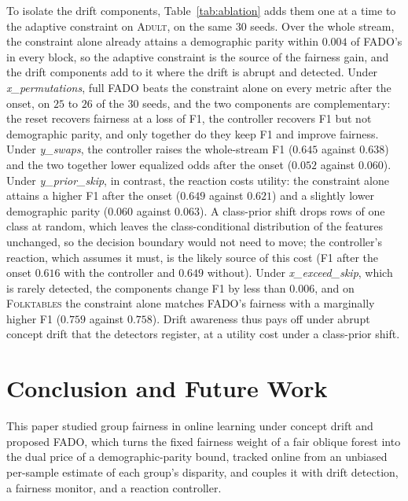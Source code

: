 \documentclass[conference]{IEEEtran}
\newcommand{\fado}{\textsc{FADO}}
\newcommand{\adult}{\textsc{Adult}}
\newcommand{\folk}{\textsc{Folktables}}
\newcommand{\rev}[1]{{\color{blue}#1}}
\renewcommand{\rev}[1]{#1}
\begin{document}
\rev{To isolate the drift components, Table~\ref{tab:ablation} adds them one at a time to the adaptive constraint on \adult{}, on the same $30$ seeds. Over the
whole stream, the constraint alone already attains a demographic parity within $0.004$ of \fado{}'s in every block, so the adaptive constraint is the source of
the fairness gain, and the drift components add to it where the drift is abrupt and detected. Under \emph{x\_permutations}, full \fado{} beats the constraint alone on every metric after the onset, on $25$ to $26$ of the $30$ seeds, and the
two components are complementary: the reset recovers fairness at a loss of F1, the controller recovers F1 but not demographic parity, and only together do they keep F1
and improve fairness. Under \emph{y\_swaps}, the controller raises the whole-stream F1 ($0.645$ against $0.638$) and the two together lower equalized odds
after the onset ($0.052$ against $0.060$). Under \emph{y\_prior\_skip}, in
contrast, the reaction costs utility: the constraint alone attains a higher F1 after the onset ($0.649$ against $0.621$) and a slightly lower demographic parity
($0.060$ against $0.063$). A class-prior shift drops rows of one class at random, which leaves the class-conditional distribution of the features unchanged, so
the decision boundary would not need to move; the controller's reaction, which assumes it must, is the likely source of this cost (F1 after the onset $0.616$ with the
controller and $0.649$ without). Under \emph{x\_exceed\_skip}, which is rarely detected, the components change F1 by less than $0.006$, and on \folk{} the constraint
alone matches \fado{}'s fairness with a marginally higher F1 ($0.759$ against $0.758$). Drift awareness thus pays off under abrupt concept drift that the
detectors register, at a utility cost under a class-prior shift.}

\section{Conclusion and Future Work}
\label{sec:conclusion}
This paper studied group fairness in online learning under concept drift and proposed \fado{}, which turns the fixed fairness weight of a fair oblique forest
into the dual price of a demographic-parity bound, tracked online from an unbiased per-sample estimate of each group's disparity, and couples it with drift
detection, a fairness monitor, and a reaction controller.
\end{document}
